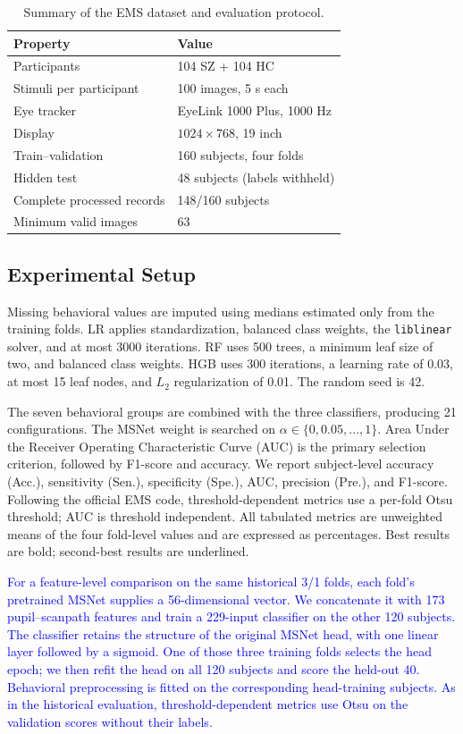 \documentclass[conference,a4paper]{IEEEtran}
\begin{document}
\begin{table}[t]
\caption{Summary of the EMS dataset and evaluation protocol.}
\label{tab:dataset}
\centering
\small
\begin{tabular}{@{}ll@{}}
\toprule
Property & Value \\
\midrule
Participants & 104 SZ + 104 HC \\
Stimuli per participant & 100 images, 5 s each \\
Eye tracker & EyeLink 1000 Plus, 1000 Hz \\
Display & $1024\times768$, 19 inch \\
Train--validation & 160 subjects, four folds \\
Hidden test & 48 subjects (labels withheld) \\
Complete processed records & 148/160 subjects \\
Minimum valid images & 63 \\
\bottomrule
\end{tabular}
\end{table}

\subsection{Experimental Setup}
Missing behavioral values are imputed using medians estimated only from the training folds. LR applies standardization, balanced class weights, the \texttt{liblinear} solver, and at most 3000 iterations. RF uses 500 trees, a minimum leaf size of two, and balanced class weights. HGB uses 300 iterations, a learning rate of 0.03, at most 15 leaf nodes, and $L_2$ regularization of 0.01. The random seed is 42.

The seven behavioral groups are combined with the three classifiers, producing 21 configurations. The MSNet weight is searched on $\alpha\in\{0,0.05,\ldots,1\}$. Area Under the Receiver Operating Characteristic Curve (AUC) is the primary selection criterion, followed by F1-score and accuracy. We report subject-level accuracy (Acc.), sensitivity (Sen.), specificity (Spe.), AUC, precision (Pre.), and F1-score. Following the official EMS code, threshold-dependent metrics use a per-fold Otsu threshold; AUC is threshold independent. All tabulated metrics are unweighted means of the four fold-level values and are expressed as percentages. Best results are bold; second-best results are underlined.

\textcolor{blue}{For a feature-level comparison on the same historical 3/1 folds, each fold's pretrained MSNet supplies a 56-dimensional vector. We concatenate it with 173 pupil--scanpath features and train a 229-input classifier on the other 120 subjects. The classifier retains the structure of the original MSNet head, with one linear layer followed by a sigmoid. One of those three training folds selects the head epoch; we then refit the head on all 120 subjects and score the held-out 40. Behavioral preprocessing is fitted on the corresponding head-training subjects. As in the historical evaluation, threshold-dependent metrics use Otsu on the validation scores without their labels.}
\end{document}
